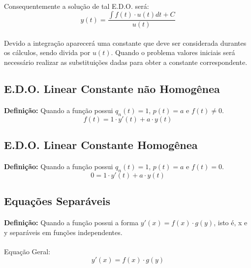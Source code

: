 \documentclass{article}
\begin{document}
\begin{enumerate}[rightmargin = \leftmargin]
        \paragraph{}Consequentemente a solução de tal E.D.O. será:
            \[y(t) = \frac{\int{f(t) \cdot u(t) dt + C}}{u(t)}\]
        \paragraph{}Devido a integração aparecerá uma constante que deve ser considerada durantes os cálculos, sendo divida por $u(t)$. Quando o problema valores iniciais será necessário realizar as substituições dadas para obter a constante correspondente.
    
    \subsection{E.D.O. Linear Constante não Homogênea}
        \paragraph{}\textbf{Definição:} Quando a função possui $q_{n}(t) = 1$, $p(t) = a$ e $f(t) \neq 0$.
            \[f(t) = 1 \cdot y'(t) + a \cdot y(t)\]
    
    \subsection{E.D.O. Linear Constante Homogênea}
        \paragraph{}\textbf{Definição:} Quando a função possui $q_{n}(t) = 1$, $p(t) = a$ e $f(t) = 0$.
            \[0 = 1 \cdot y'(t) + a \cdot y(t)\]
        
    \subsection{Equações Separáveis}
        \paragraph{}\textbf{Definição:} Quando a função possui a forma $y'(x)=f(x) \cdot g(y)$, isto é,  x e y separáveis em funções independentes.
        \paragraph{}Equação Geral:
            \[y'(x)=f(x) \cdot g(y)\]
        

\end{enumerate}
\end{document}
